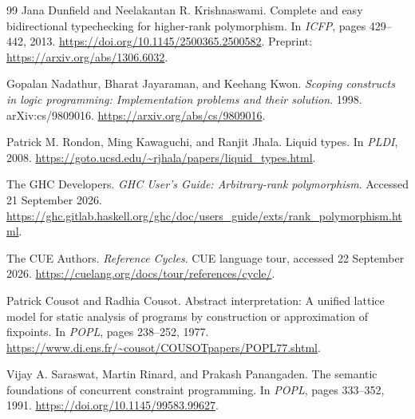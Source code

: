 \documentclass[11pt,a4paper,oneside]{report}
\theoremstyle{remark}
\begin{document}
\begin{thebibliography}{99}
Jana Dunfield and Neelakantan R. Krishnaswami.
Complete and easy bidirectional typechecking for higher-rank polymorphism.
In \emph{ICFP}, pages 429--442, 2013.
\url{https://doi.org/10.1145/2500365.2500582}.
Preprint: \url{https://arxiv.org/abs/1306.6032}.

Gopalan Nadathur, Bharat Jayaraman, and Keehang Kwon.
\emph{Scoping constructs in logic programming: Implementation problems
and their solution}.
1998. arXiv:cs/9809016.
\url{https://arxiv.org/abs/cs/9809016}.

Patrick M. Rondon, Ming Kawaguchi, and Ranjit Jhala.
Liquid types.
In \emph{PLDI}, 2008.
\url{https://goto.ucsd.edu/~rjhala/papers/liquid_types.html}.

The GHC Developers.
\emph{GHC User's Guide: Arbitrary-rank polymorphism}.
Accessed 21 September 2026.
\url{https://ghc.gitlab.haskell.org/ghc/doc/users_guide/exts/rank_polymorphism.html}.


The CUE Authors.
\emph{Reference Cycles}.
CUE language tour, accessed 22 September 2026.
\url{https://cuelang.org/docs/tour/references/cycle/}.

Patrick Cousot and Radhia Cousot.
Abstract interpretation: A unified lattice model for static analysis of programs
by construction or approximation of fixpoints.
In \emph{POPL}, pages 238--252, 1977.
\url{https://www.di.ens.fr/~cousot/COUSOTpapers/POPL77.shtml}.

Vijay A. Saraswat, Martin Rinard, and Prakash Panangaden.
The semantic foundations of concurrent constraint programming.
In \emph{POPL}, pages 333--352, 1991.
\url{https://doi.org/10.1145/99583.99627}.

\end{thebibliography}
\end{document}
